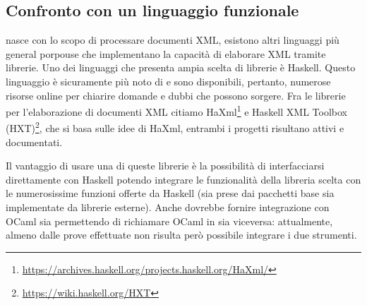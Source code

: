 \subsection{Confronto con un linguaggio funzionale}
\cduce nasce con lo scopo di processare documenti XML, esistono altri linguaggi più general porpouse che implementano la capacità di elaborare XML tramite librerie. Uno dei linguaggi che presenta ampia scelta di librerie è Haskell. Questo linguaggio è sicuramente più noto di \cduce e sono disponibili, pertanto, numerose risorse online per chiarire domande e dubbi che possono sorgere. Fra le librerie per l'elaborazione di documenti XML citiamo HaXml\footnote{\url{https://archives.haskell.org/projects.haskell.org/HaXml/}} e Haskell XML Toolbox (HXT)\footnote{\url{https://wiki.haskell.org/HXT}}, che si basa sulle idee di HaXml, entrambi i progetti risultano attivi e documentati.

Il vantaggio di usare una di queste librerie è la possibilità di interfacciarsi direttamente con Haskell potendo integrare le funzionalità della libreria scelta con le numerosissime funzioni offerte da Haskell (sia prese dai pacchetti base sia implementate da librerie esterne). Anche \cduce dovrebbe fornire integrazione con OCaml sia permettendo di richiamare OCaml in \cduce sia viceversa: attualmente, almeno dalle prove effettuate non risulta però possibile integrare i due strumenti.

